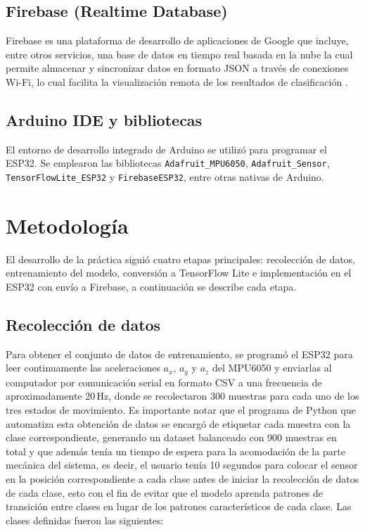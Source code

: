 \documentclass[conference]{IEEEtran}
\begin{document}
\subsection{Firebase (Realtime Database)}
Firebase es una plataforma de desarrollo de aplicaciones de Google que incluye, entre otros servicios, una base de datos en tiempo real basada en la nube la cual permite almacenar y sincronizar datos en formato JSON a través de conexiones Wi-Fi, lo cual facilita la visualización remota de los resultados de clasificación \cite{firebase2023}.

\subsection{Arduino IDE y bibliotecas}
El entorno de desarrollo integrado de Arduino se utilizó para programar el ESP32. Se emplearon las bibliotecas \texttt{Adafruit\_MPU6050}, \texttt{Adafruit\_Sensor}, \texttt{TensorFlowLite\_ESP32} y \texttt{FirebaseESP32}, entre otras nativas de Arduino.

\section{Metodología}

El desarrollo de la práctica siguió cuatro etapas principales: recolección de datos, entrenamiento del modelo, conversión a TensorFlow Lite e implementación en el ESP32 con envío a Firebase, a continuación se describe cada etapa.

\subsection{Recolección de datos}

Para obtener el conjunto de datos de entrenamiento, se programó el ESP32 para leer continuamente las aceleraciones $a_x$, $a_y$ y $a_z$ del MPU6050 y enviarlas al computador por comunicación serial en formato CSV a una frecuencia de aproximadamente 20\,Hz, donde se recolectaron 300 muestras para cada uno de los tres estados de movimiento. Es importante notar que el programa de Python que automatiza esta obtención de datos se encargó de etiquetar cada muestra con la clase correspondiente, generando un dataset balanceado con 900 muestras en total y que además tenía un tiempo de espera para la acomodación de la parte mecánica del sistema, es decir, el usuario tenía 10 segundos para colocar el sensor en la posición correspondiente a cada clase antes de iniciar la recolección de datos de cada clase, esto con el fin de evitar que el modelo aprenda patrones de transición entre clases en lugar de los patrones característicos de cada clase. Las clases definidas fueron las siguientes:
\end{document}
